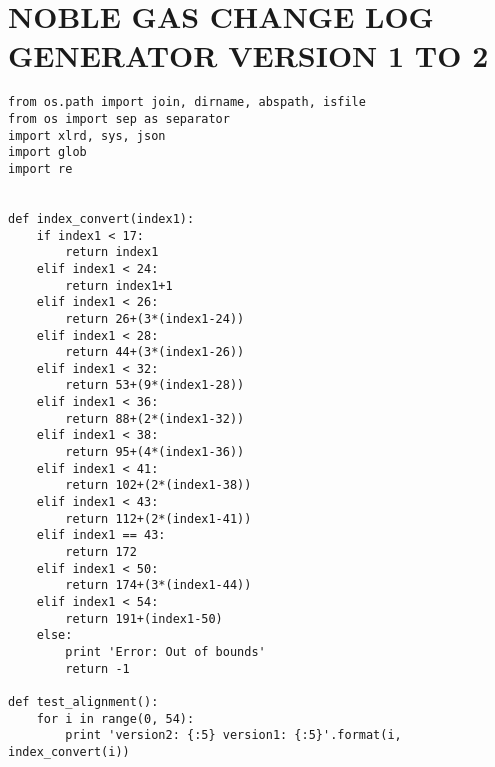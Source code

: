 
\appendix    %

\chapter{NOBLE GAS CHANGE LOG GENERATOR VERSION 1 TO 2}
\begin{verbatim}
from os.path import join, dirname, abspath, isfile
from os import sep as separator
import xlrd, sys, json
import glob
import re


def index_convert(index1):
	if index1 < 17:
		return index1
	elif index1 < 24:
		return index1+1
	elif index1 < 26:
		return 26+(3*(index1-24))
	elif index1 < 28:
		return 44+(3*(index1-26))
	elif index1 < 32:
		return 53+(9*(index1-28))
	elif index1 < 36:
		return 88+(2*(index1-32))
	elif index1 < 38:
		return 95+(4*(index1-36))
	elif index1 < 41:
		return 102+(2*(index1-38))
	elif index1 < 43:
		return 112+(2*(index1-41))
	elif index1 == 43:
		return 172
	elif index1 < 50:
		return 174+(3*(index1-44))
	elif index1 < 54:
		return 191+(index1-50)
	else:
		print 'Error: Out of bounds'
		return -1

def test_alignment():
	for i in range(0, 54):
		print 'version2: {:5} version1: {:5}'.format(i, index_convert(i))


\end{verbatim}
